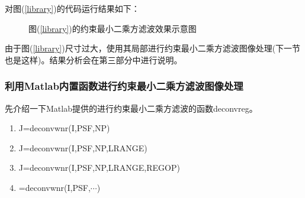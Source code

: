 \documentclass[UTF8]{ctexart}
\begin{document}
    对图(\ref{library})的代码运行结果如下：
    \begin{figure}[htbp]
        \centering
        \caption{图(\ref{library})的约束最小二乘方滤波效果示意图}
        \label{librarylimitmin1}
    \end{figure}

    由于图(\ref{library})尺寸过大，使用其局部进行约束最小二乘方滤波图像处理(下一节也是这样)。结果分析会在第三部分中进行说明。
    \subsubsection{利用Matlab内置函数进行约束最小二乘方滤波图像处理}
    先介绍一下Matlab提供的进行约束最小二乘方滤波的函数{\ttfamily deconvreg}。
    \begin{enumerate}[label=(\arabic*),itemindent=1.5em]
        \item {\ttfamily J=deconvwnr(I,PSF,NP)}
        \item {\ttfamily J=deconvwnr(I,PSF,NP,LRANGE)}
        \item {\ttfamily J=deconvwnr(I,PSF,NP,LRANGE,REGOP)}
        \item {\ttfamily [J,LAGRA]=deconvwnr(I,PSF,$\cdots$)}
    \end{enumerate}
\end{document}
